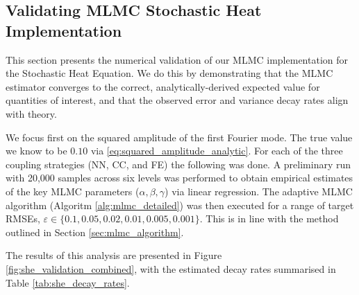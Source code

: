 \subsection{Validating MLMC Stochastic Heat Implementation}\label{sec:stoch_heat_validation}

This section presents the numerical validation of our MLMC implementation for the Stochastic Heat Equation. 
We do this by demonstrating that the MLMC estimator converges to the correct, 
analytically-derived expected value for quantities of interest, and that the observed 
error and variance decay rates align with theory.

We focus first on the squared amplitude of the first Fourier mode. The true value we know to 
be $0.10$
via \eqref{eq:squared_amplitude_analytic}.
For each of the three coupling strategies (NN, CC, and FE) the following was done. 
A preliminary run with 20,000 samples across six levels was performed to obtain 
empirical estimates of the key MLMC 
parameters ($\alpha, \beta, \gamma$) via linear regression. 
The adaptive MLMC algorithm (Algoritm \ref{alg:mlmc_detailed}) was then executed for a range of 
target RMSEs, $\varepsilon \in \{0.1, 0.05, 0.02, 0.01, 0.005, 0.001\}$. This is in line with the 
method outlined in Section
\ref{sec:mlmc_algorithm}.

The results of this analysis are presented in Figure \ref{fig:she_validation_combined}, 
with the estimated decay rates summarised in Table \ref{tab:she_decay_rates}.

